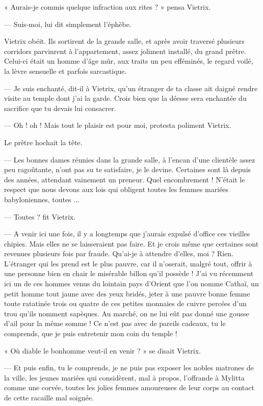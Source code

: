\documentclass[a4paper, 11pt, oneside, polutonikogreek, french]{article}
\begin{document}
« Aurais-je commis quelque infraction aux rites ? » pensa Vietrix.

--- Suis-moi, lui dit simplement l'éphèbe.

Vietrix obéit. Ils sortirent de la grande salle, et après avoir traversé plusieurs corridors parvinrent à l'appartement, assez joliment installé, du grand prêtre. Celui-ci était un homme d'âge mûr, aux traits un peu efféminés, le regard voilé, la lèvre sensuelle et parfois sarcastique.

--- Je suis enchanté, dit-il à Vietrix, qu'un étranger de ta classe ait daigné rendre visite au temple dont j'ai la garde. Crois bien que la déesse sera enchantée du sacrifice que tu devais lui consacrer.

--- Oh ! oh ! Mais tout le plaisir est pour moi, protesta poliment Vietrix.

Le prêtre hochait la tête.

--- Les bonnes dames réunies dans la grande salle, à l'encan d'une clientèle assez peu ragoûtante, n'ont pas su te satisfaire, je le devine. Certaines sont là depuis des années, attendant vainement un preneur. Quel encombrement ! N'était le respect que nous devons aux lois qui obligent toutes les femmes mariées babyloniennes, toutes ...

--- Toutes ? fit Vietrix.

--- A venir ici une fois, il y a longtemps que j'aurais expulsé d'office ces vieilles chipies. Mais elles ne se laisseraient pas faire. Et je crois même que certaines sont revenues plusieurs fois par fraude. Qu'ai-je à attendre d'elles, moi ? Rien. L'étranger qui les prend est le plus pauvre, car il n'oserait, malgré tout, offrir à une personne bien en chair le misérable billon qu'il possède ! J'ai vu récemment ici un de ces hommes venus du lointain pays d'Orient que l'on nomme Cathaï, un petit homme tout jaune avec des yeux bridés, jeter à une pauvre bonne femme toute ratatinée trois ou quatre de ces petites monnaies de cuivre percées d'un trou qu'ils nomment sapèques. Au marché, on ne lui eût pas donné une gousse d'ail pour la même somme ! Ce n'est pas avec de pareils cadeaux, tu le comprends, que je puis entretenir mon coin du temple !

« Où diable le bonhomme veut-il en venir ? » se disait Vietrix.

--- Et puis enfin, tu le comprends, je ne puis pas exposer les nobles matrones de la ville, les jeunes mariées qui considèrent, mal à propos, l'offrande à Mylitta comme une corvée, toutes les jolies femmes amoureuses de leur corps au contact de cette racaille mal soignée.
\end{document}
